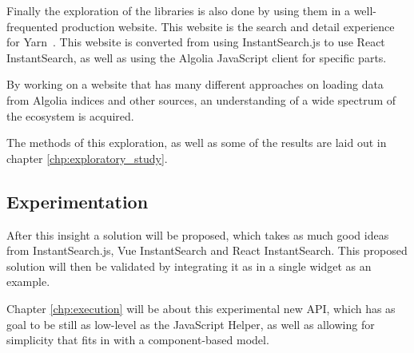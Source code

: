 Finally the exploration of the libraries is also done by using them in a well-frequented production website. This website is the search and detail experience for Yarn\cite{yarn-site}~. This website is converted from using InstantSearch.js to use React InstantSearch, as well as using the Algolia JavaScript client for specific parts.

By working on a website that has many different approaches on loading data from Algolia indices and other sources, an understanding of a wide spectrum of the ecosystem is acquired.

The methods of this exploration, as well as some of the results are laid out in chapter \ref{chp:exploratory_study}.

\subsection{Experimentation}

After this insight a solution will be proposed, which takes as much good ideas from InstantSearch.js, Vue InstantSearch and React InstantSearch. This proposed solution will then be validated by integrating it as in a single widget as an example.

Chapter \ref{chp:execution} will be about this experimental new API, which has as goal to be still as low-level as the JavaScript Helper, as well as allowing for simplicity that fits in with a component-based model.
